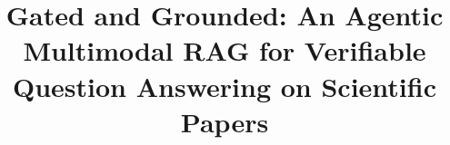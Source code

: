 \documentclass[conference,a4paper]{IEEEtran}
\begin{document}
\title{Gated and Grounded: An Agentic Multimodal RAG for Verifiable Question
Answering on Scientific Papers}


\maketitle











\end{document}
